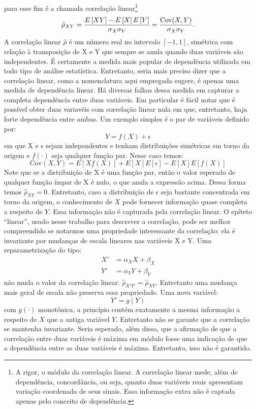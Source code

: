  para esse fim é a chamada correlação linear\footnote{A rigor, o módulo da correlação linear. A correlação linear mede, além de dependência, concordância, ou seja, quanto duas variáveis reais apresentam variação coordenada de seus sinais. Essa informação extra não é captada apenas pelo conceito de dependência.}
\begin{equation}
 \hat{\rho}_{XY} = \frac{E\left[XY\right] - E\left[X\right]E\left[Y\right]}{\sigma_X \sigma_Y} = \frac{\mathrm{Cov}(X,Y)}{\sigma_X \sigma_Y}.
\end{equation}
A correlação linear $\hat{\rho}$ é um número real no intervalo $[-1,1]$, simétrica com relação à transposição de X e Y que sempre se anula quando duas variáveis são independentes. É certamente a medida mais popular de dependência utilizada em todo tipo de análise estatística. Entretanto, seria mais preciso dizer que a correlação linear, como a nomenclatura aqui empregada sugere, é apenas uma medida de dependência linear. Há diversas falhas dessa medida em capturar a completa dependência entre duas variáveis. Em particular é fácil notar que é possível obter duas variavéis com correlação linear nula em que, entretanto, haja forte dependência entre ambas. Um exemplo simples é o par de variáveis definido por:
\begin{equation}
 Y = f(X) + \epsilon
\end{equation}
em que X e $\epsilon$ sejam independentes e tenham distribuições simétricas em torno da origem e $f(\cdot)$ seja qualquer função par. Nesse caso temos:
\begin{equation*}
 \mathrm{Cov}(X,Y) = E[X f(X)] + E[X] E[\epsilon] - E[X] E[f(X)]
\end{equation*}
Note que se a distribuição de X é uma função par, então o valor esperado de qualquer função ímpar de X é nulo, o que anula a expressão acima. Dessa forma temos $\hat{\rho}_{XY} = 0$. Entretanto, caso a distribuição de $\epsilon$ seja bastante concentrada em torno da origem, o conhecimento de $X$ pode fornecer informação quase completa a respeito de $Y$. Essa informação não é capturada pela correlação linear. O epíteto ``linear'', usado nesse trabalho para descrever a correlação, pode ser melhor compreendido se notarmos uma propriedade interessante da correlação: ela é invariante por mudanças de escala lineares nas variáveis X e Y. Uma reparametrização do tipo:
\begin{align*}
 X' &= \alpha_{X} X + \beta_{X} \\
 Y' &= \alpha_{Y} Y + \beta_{Y} 
\end{align*}
não muda o valor da correlação linear: $\hat{\rho}_{X'Y'} = \hat{\rho}_{XY}$. Entretanto uma mudança mais geral de escala não preserva essa propriedade. Uma  nova variável:
\begin{equation*}
Y' = g(Y)
\end{equation*}
com $g(\cdot)$ monotônica, a princípio contém exatamente a mesma informação a respeito de $X$ que a antiga variável $Y$. Entretanto não se garante que a correlação se mantenha invariante. Seria esperado, além disso, que a afirmação de que a correlação entre duas variáveis é máxima em módulo fosse uma indicação de que a dependência entre as duas variáveis é máxima. Entretanto, isso não é garantido. 

